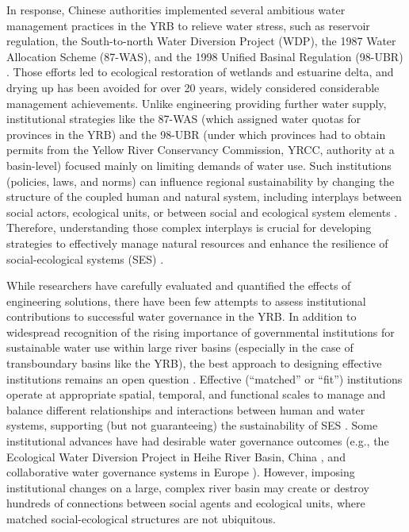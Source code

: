 In response, Chinese authorities implemented several ambitious water management practices in the YRB to relieve water stress, such as reservoir regulation, the South-to-north Water Diversion Project (WDP), the 1987 Water Allocation Scheme (87-WAS), and the 1998 Unified Basinal Regulation (98-UBR) \cite{long2020, wang2019d}.
Those efforts led to ecological restoration of wetlands and estuarine delta, and drying up has been avoided for over 20 years, widely considered considerable management achievements.
Unlike engineering providing further water supply, institutional strategies like the 87-WAS (which assigned water quotas for provinces in the YRB) and the 98-UBR (under which provinces had to obtain permits from the Yellow River Conservancy Commission, YRCC, authority at a basin-level) focused mainly on limiting demands of water use.
Such institutions (policies, laws, and norms) can influence regional sustainability by changing the structure of the coupled human and natural system, including interplays between social actors, ecological units, or between social and ecological system elements
\cite{young2008,cumming2020b,lien2020, bodin2017b}.
Therefore, understanding those complex interplays is crucial for developing strategies to effectively manage natural resources and enhance the resilience of social-ecological systems (SES) \cite{kluger2020}.

While researchers have carefully evaluated and quantified the effects of engineering solutions\cite{long2020}, there have been few attempts to assess institutional contributions to successful water governance in the YRB.
In addition to widespread recognition of the rising importance of governmental institutions for sustainable water use within large river basins (especially in the case of transboundary basins like the YRB), the best approach to designing effective institutions remains an open question \cite{agrawal2003, persha2011, agrawal2001}.
Effective (``matched'' or ``fit'') institutions operate at appropriate spatial, temporal, and functional scales to manage and balance different relationships and interactions between human and water systems, supporting (but not guaranteeing) the sustainability of SES \cite{epstein2015, wang2019d}.
Some institutional advances have had desirable water governance outcomes (e.g., the Ecological Water Diversion Project in Heihe River Basin, China \cite{wang2019d}, and collaborative water governance systems in Europe \cite{green2013}).
However, imposing institutional changes on a large, complex river basin may create or destroy hundreds of connections between social agents and ecological units, where matched social-ecological structures are not ubiquitous.

